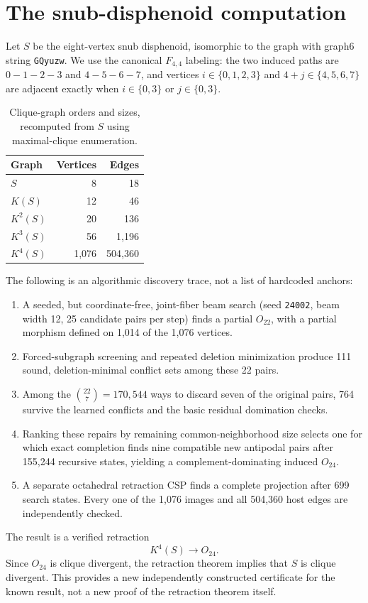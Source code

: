 \documentclass[11pt]{article}
\begin{document}
\section{The snub-disphenoid computation}
Let \(S\) be the eight-vertex snub disphenoid, isomorphic to the graph
with graph6 string \texttt{GQyuzw}. We use the canonical
\(F_{4,4}\) labeling: the two induced paths are
\(0\! -\! 1\! -\! 2\! -\! 3\) and
\(4\! -\! 5\! -\! 6\! -\! 7\), and vertices \(i\in\{0,1,2,3\}\)
and \(4+j\in\{4,5,6,7\}\) are adjacent exactly when
\(i\in\{0,3\}\) or \(j\in\{0,3\}\).

\begin{table}[ht]
\centering
\begin{tabular}{@{}lrr@{}}
\toprule
Graph & Vertices & Edges\\
\midrule
\(S\) & 8 & 18\\
\(K(S)\) & 12 & 46\\
\(K^2(S)\) & 20 & 136\\
\(K^3(S)\) & 56 & 1,196\\
\(K^4(S)\) & 1,076 & 504,360\\
\bottomrule
\end{tabular}
\caption{Clique-graph orders and sizes, recomputed from \(S\) using maximal-clique enumeration.}
\end{table}

The following is an algorithmic discovery trace, not a list of
hardcoded anchors:
\begin{enumerate}
\item A seeded, but coordinate-free, joint-fiber beam search
(seed \texttt{24002}, beam width 12, 25 candidate pairs per step)
finds a partial \(O_{22}\), with a partial morphism defined on
1,014 of the 1,076 vertices.
\item Forced-subgraph screening and repeated deletion minimization
produce 111 sound, deletion-minimal conflict sets among these 22 pairs.
\item Among the \(\binom{22}{7}=170{,}544\) ways to discard seven
of the original pairs, 764 survive the learned conflicts and the
basic residual domination checks.
\item Ranking these repairs by remaining common-neighborhood size
selects one for which exact completion finds nine compatible
new antipodal pairs after 155,244 recursive states, yielding a
complement-dominating induced \(O_{24}\).
\item A separate octahedral retraction CSP finds a complete
projection after 699 search states. Every one of the 1,076 images
and all 504,360 host edges are independently checked.
\end{enumerate}
The result is a verified retraction
\[
       \boxed{K^4(S)\longrightarrow O_{24}.}
\]
Since \(O_{24}\) is clique divergent, the retraction theorem implies
that \(S\) is clique divergent. This provides a new independently
constructed certificate for the known result, not a new proof of the
retraction theorem itself.
\end{document}
